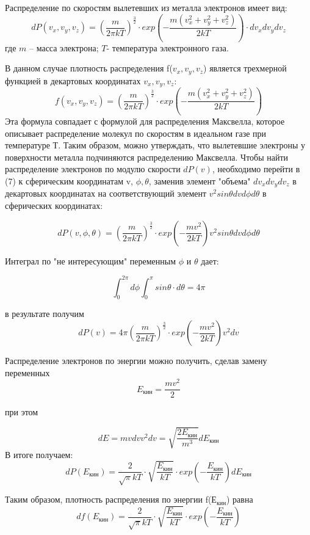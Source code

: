 Распределение по скоростям
вылетевших из металла электронов имеет вид: 
\begin{equation}
    dP(v_x, v_y, v_z)  = (\frac{m}{2\pi kT})^{\frac{3}{2}} \cdot exp(-\frac{m(v_{x}^{2} + v_{y}^{2} + v_{z}^{2})}{2kT})\cdot dv_{x} dv_{y}dv_{z}
\end{equation}
где $m$ – масса электрона; $T$- температура электронного газа.
\par 
В данном случае плотность распределения f($v_x, v_y, v_z$) является
трехмерной функцией в декартовых координатах $v_x, v_y, v_z$:
\[f(v_x, v_y, v_z) = (\frac{m}{2\pi kT})^{\frac{3}{2}} \cdot exp(-\frac{m(v_{x}^{2} + v_{y}^{2} + v_{z}^{2})}{2kT})\]
Эта формула совпадает с формулой для распределения Максвелла, которое
описывает распределение молекул по скоростям в идеальном газе при
температуре $Т$. Таким образом, можно утверждать, что вылетевшие электроны у
поверхности металла подчиняются распределению Максвелла.
Чтобы найти распределение электронов по модулю скорости $dP(v)$,
необходимо перейти в (7) к сферическим координатам v, $\phi, \theta$, заменив элемент
"объема" $dv_xdv_ydv_z$ в декартовых координатах на соответствующий элемент
$v^2sin\theta dv d \phi d \theta $ в сферических координатах:

\[dP(v, \phi, \theta) = (\frac{m}{2\pi kT})^{\frac{3}{2}} \cdot exp(-\frac{mv^2}{2kT}) v^2 sin \theta dv d \phi d \theta \]

Интеграл по "не интересующим" переменным $\phi$ и $\theta$ дает:

\[\int_{0}^{2\pi}d\phi \int_{0}^{\pi}sin\theta \cdot d\theta = 4\pi\]

в результате получим
\begin{equation}
    dP(v) = 4\pi (\frac{m}{2\pi kT})^{\frac{3}{2}} \cdot exp(-\frac{mv^2}{2kT}) v^2 dv
\end{equation}

\par 
Распределение электронов по энергии можно получить, сделав замену
переменных
\[E_{\text{кин}} = \frac{mv^2}{2}\]

при этом

\[dE = mvdv v^2dv = \sqrt{\frac{2E_{\text{кин}}}{m^3}}dE_{кин}\]
В итоге получаем:
\[dP(E_{\text{кин}}) = \frac{2}{\sqrt{\pi}kT}\cdot \sqrt{\frac{E_{\text{кин}}}{kT}} \cdot exp(-\frac{E_{\text{кин}}}{kT})dE_{\text{кин}}\]

Таким образом, плотность распределения по энергии f($Е_{\text{кин}}$) равна
\begin{equation}
    df(E_{\text{кин}}) = \frac{2}{\sqrt{\pi}kT}\cdot \sqrt{\frac{E_{\text{кин}}}{kT}} \cdot exp(-\frac{E_{\text{кин}}}{kT})
\end{equation}

